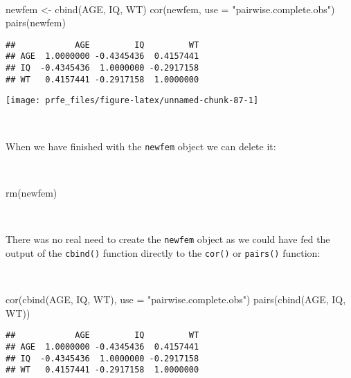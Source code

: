 \documentclass[
  12pt,
  a4paper]{book}
\newenvironment{Shaded}{\begin{snugshade}}{\end{snugshade}}
\newcommand{\AttributeTok}[1]{\textcolor[rgb]{0.77,0.63,0.00}{#1}}
\newcommand{\FunctionTok}[1]{\textcolor[rgb]{0.00,0.00,0.00}{#1}}
\newcommand{\NormalTok}[1]{#1}
\newcommand{\OtherTok}[1]{\textcolor[rgb]{0.56,0.35,0.01}{#1}}
\newcommand{\StringTok}[1]{\textcolor[rgb]{0.31,0.60,0.02}{#1}}
\begin{document}
~

\begin{Shaded}
\begin{Highlighting}[]
\NormalTok{newfem }\OtherTok{\textless{}{-}} \FunctionTok{cbind}\NormalTok{(AGE, IQ, WT)}
\FunctionTok{cor}\NormalTok{(newfem, }\AttributeTok{use =} \StringTok{"pairwise.complete.obs"}\NormalTok{)}
\FunctionTok{pairs}\NormalTok{(newfem)}
\end{Highlighting}
\end{Shaded}

\begin{verbatim}
##            AGE         IQ         WT
## AGE  1.0000000 -0.4345436  0.4157441
## IQ  -0.4345436  1.0000000 -0.2917158
## WT   0.4157441 -0.2917158  1.0000000
\end{verbatim}

\newpage

\begin{center}\texttt{[image: prfe\_files/figure-latex/unnamed-chunk-87-1]} \end{center}

~

When we have finished with the \texttt{newfem} object we can delete it:

~

\begin{Shaded}
\begin{Highlighting}[]
\FunctionTok{rm}\NormalTok{(newfem)}
\end{Highlighting}
\end{Shaded}

~

There was no real need to create the \texttt{newfem} object as we could have fed the output of the \texttt{cbind()} function directly to the \texttt{cor()} or \texttt{pairs()} function:

~

\begin{Shaded}
\begin{Highlighting}[]
\FunctionTok{cor}\NormalTok{(}\FunctionTok{cbind}\NormalTok{(AGE, IQ, WT), }\AttributeTok{use =} \StringTok{"pairwise.complete.obs"}\NormalTok{)}
\FunctionTok{pairs}\NormalTok{(}\FunctionTok{cbind}\NormalTok{(AGE, IQ, WT))}
\end{Highlighting}
\end{Shaded}

\begin{verbatim}
##            AGE         IQ         WT
## AGE  1.0000000 -0.4345436  0.4157441
## IQ  -0.4345436  1.0000000 -0.2917158
## WT   0.4157441 -0.2917158  1.0000000
\end{verbatim}
\end{document}

